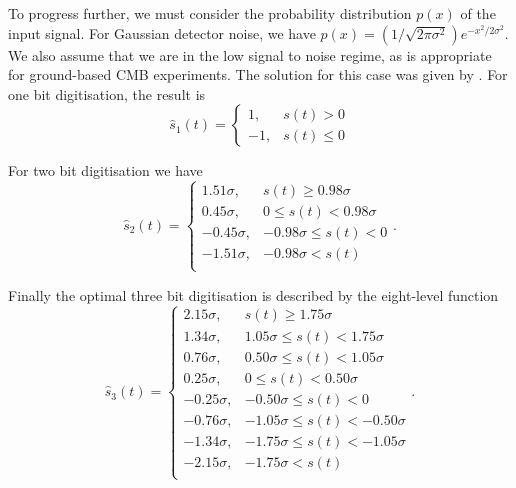 \documentclass[apj]{emulateapj}
\begin{document}
To progress further, we must consider the probability distribution $p(x)$ of the input signal. For Gaussian detector noise, we have $p(x) = (1/\sqrt{2\pi\sigma^2}) e^{-x^2/2\sigma^2}$. We also assume that we are in the low signal to noise regime, as is appropriate for ground-based CMB experiments. The solution for this case was given by \cite{max1960}. For one bit digitisation, the result is
\begin{equation} \label{eq:1bit}
\hat{s}_1(t) = \left\{ \begin{array}{lr}
1, & s(t) > 0\\
-1, & s(t) \leq 0
\end{array} \right. \end{equation}

For two bit digitisation we have
\begin{equation}  \label{eq:2bit}
\hat{s}_2(t) = \left\{ \begin{array}{rl}
1.51 \sigma, & s(t) \geq 0.98 \sigma\\
0.45 \sigma, & 0 \leq s(t) < 0.98 \sigma\\
-0.45 \sigma, & -0.98 \sigma \leq s(t) < 0\\
-1.51 \sigma, & -0.98 \sigma < s(t)\\
\end{array} \right. . \end{equation}

Finally the optimal three bit digitisation is described by the eight-level function
\begin{equation}  \label{eq:3bit}
\hat{s}_3(t) = \left\{ \begin{array}{rl}
2.15 \sigma, & s(t) \geq 1.75 \sigma\\
1.34 \sigma, & 1.05 \sigma \leq s(t) < 1.75 \sigma\\
0.76 \sigma, & 0.50 \sigma \leq s(t) < 1.05 \sigma\\
0.25 \sigma, & 0 \leq s(t) < 0.50 \sigma\\
-0.25 \sigma, & -0.50 \sigma \leq s(t) < 0\\
-0.76 \sigma, & -1.05 \sigma \leq s(t) < -0.50 \sigma\\
-1.34 \sigma, & -1.75 \sigma \leq s(t) < -1.05 \sigma\\
-2.15 \sigma, & -1.75 \sigma < s(t)\\
\end{array} \right. . \end{equation}
\end{document}
